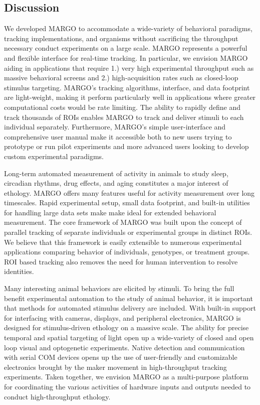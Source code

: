 \documentclass[10pt]{article}
\begin{document}
\begin{multicols}{2}
\section*{Discussion}

We developed MARGO to accommodate a wide-variety of behavioral paradigms, tracking implementations, and organisms without sacrificing the throughput necessary conduct experiments on a large scale. MARGO represents a  powerful and flexible interface for real-time tracking. In particular, we envision MARGO aiding in applications that require 1.) very high experimental throughput such as massive behavioral screens and 2.) high-acquisition rates such as closed-loop stimulus targeting. MARGO's tracking algorithms, interface, and data footprint are light-weight, making it perform particularly well in applications where greater computational costs would be rate limiting. The ability to rapidly define and track thousands of ROIs enables MARGO to track and deliver stimuli to each individual separately. Furthermore, MARGO's simple user-interface and comprehensive user manual make it accessible both to new users trying to prototype or run pilot experiments and more advanced users looking to develop custom experimental paradigms.

Long-term automated measurement of activity in animals to study sleep, circadian rhythms, drug effects, and aging constitutes a major interest of ethology. MARGO offers many features useful for activity measurement over long timescales. Rapid experimental setup, small data footprint, and built-in utilities for handling large data sets make make ideal for extended behavioral measurement. The core framework of MARGO was built upon the concept of parallel tracking of separate individuals or experimental groups in distinct ROIs. We believe that this framework is easily extensible to numerous experimental applications comparing behavior of individuals, genotypes, or treatment groups. ROI based tracking also removes the need for human intervention to resolve identities.  

Many interesting animal behaviors are elicited by stimuli. To bring the full benefit experimental automation to the study of animal behavior, it is important that methods for automated stimulus delivery are included. With built-in support for interfacing with cameras, displays, and peripheral electronics, MARGO is designed for stimulus-driven ethology on a massive scale. The ability for precise temporal and spatial targeting of light open up a wide-variety of closed and open loop visual and optogenetic experiments. Native detection and communication with serial COM devices opens up the use of user-friendly and customizable electronics brought by the maker movement in high-throughput tracking experiments. Taken together, we envision MARGO as a multi-purpose platform for coordinating the various activities of hardware inputs and outputs needed to conduct high-throughput ethology. 


\end{multicols}
\end{document}
